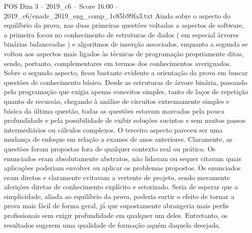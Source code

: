 \begin{textsample}{POS Dim 3 – 2019\_c6 – Score 16.00 – 2019\_c6/enade\_2019\_eng\_comp\_1c85b99fa3.txt}
Ainda sobre o aspecto do equilíbrio da prova, nas duas primeiras questões voltadas a aspectos de software, a primeira focou no conhecimento de estruturas de dados ( em especial árvores binárias balanceadas ) e algoritmos de inserção associados, enquanto a segunda se voltou aos aspectos mais ligados às técnicas de programação propriamente ditas, sendo, portanto, complementares em termos dos conhecimentos averiguados.
Sobre o segundo aspecto, ficou bastante evidente a orientação da prova em buscar questões de conhecimento básico.
Desde as estruturas de árvore binária, passando pela programação que exigia apenas conceitos simples, tanto de laços de repetição quanto de recursão, chegando à análise de circuitos extremamente simples e básica da última questão, todas as questões estavam marcadas pela pouca profundidade e pela possibilidade de exibir soluções sucintas e sem muitos passos intermediários ou cálculos complexos.
O terceiro aspecto pareceu ser uma mudança de enfoque em relação a exames de anos anteriores.
Claramente, as questões foram propostas fora de qualquer contexto real ou prático.
Os enunciados eram absolutamente abstratos, não lidavam ou sequer citavam quais aplicações poderiam envolver ou aplicar os problemas propostos.
Os enunciados eram diretos e claramente evitavam a vertente de projeto, sendo meramente aferições diretas de conhecimento explícito e setorizado.
Seria de esperar que a simplicidade, aliada ao equilíbrio da prova, poderia surtir o efeito de tornar a prova mais fácil de forma geral, já que supostamente abrangeria mais perfis profissionais sem exigir profundidade em qualquer um deles.
Entretanto, os resultados sugerem uma qualidade de formação aquém daquela desejada.

\end{textsample}
